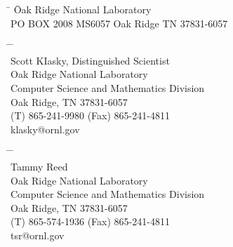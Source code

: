 \thispagestyle{empty}

\begin{center}
\textbf{\Large \baseproposaltitle}
\end{center}

\begin{center}
\end{center}

\medskip

\begin{tabbing}
\hspace*{10mm} \=  \= Oak Ridge National Laboratory \\
\>  \>PO BOX 2008 MS6057 Oak Ridge TN 37831-6057\\
\end{tabbing}

\medskip

\begin{tabbing}
\hspace*{10mm} \=  \=
\vrule height0.4pt depth 0pt width 2.5in \\
\> \> Scott KIasky,  Distinguished Scientist \\
\> \> Oak Ridge National Laboratory \\
\> \> Computer Science and Mathematics Division \\
\> \> Oak Ridge, TN 37831-6057 \\
\> \> (T) 865-241-9980 (Fax) 865-241-4811 \\
\> \> klasky@ornl.gov
\end{tabbing}

\medskip

\begin{tabbing}
\hspace*{10mm} \=  \=
\vrule height0.4pt depth 0pt width 2.5in \\
\> \> Tammy Reed \\
\> \> Oak Ridge National Laboratory \\
\> \>Computer Science and Mathematics Division \\
\> \> Oak Ridge, TN 37831-6057 \\
\> \> (T) 865-574-1936 (Fax) 865-241-4811\\
\> \> tsr@ornl.gov
\end{tabbing}

